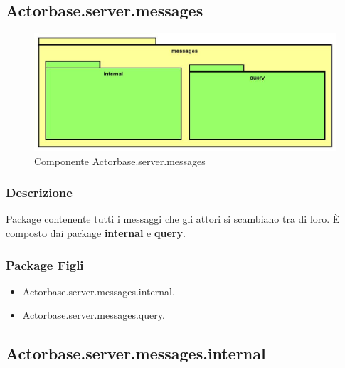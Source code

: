 \documentclass[a4paper]{article}
\begin{document}
				\newpage
				
				
				
				
				
		
		
				
		\subsection{Actorbase.server.messages}
		
			\begin{figure}[H]
				\centering
				\includegraphics[width=\textwidth]{ST/Server/messagesLevel.jpg}
				\caption{Componente Actorbase.server.messages}
			\end{figure}
			
			\subsubsection{Descrizione}
				Package contenente tutti i messaggi che gli attori si scambiano tra di loro.
				È composto dai package \textbf{internal} e \textbf{query}.
				
			\subsubsection{Package Figli}
				\begin{itemize}
					\item Actorbase.server.messages.internal.
					\item Actorbase.server.messages.query.
				\end{itemize}
				
		\subsection{Actorbase.server.messages.internal}
		
\end{document}
